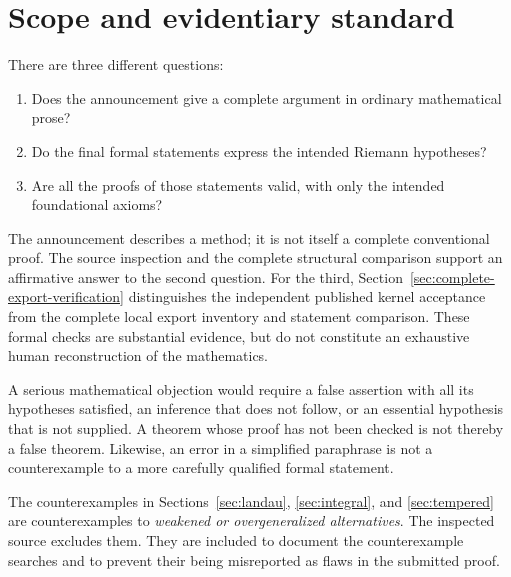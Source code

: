 \documentclass[11pt,a4paper]{article}
\theoremstyle{remark}
\begin{document}
\section{Scope and evidentiary standard}
There are three different questions:
\begin{enumerate}
\item Does the announcement give a complete argument in ordinary mathematical prose?
\item Do the final formal statements express the intended Riemann hypotheses?
\item Are all the proofs of those statements valid, with only the intended foundational axioms?
\end{enumerate}
The announcement describes a method; it is not itself a complete conventional proof. The source inspection and the complete structural comparison support an affirmative answer to the second question. For the third, Section~\ref{sec:complete-export-verification} distinguishes the independent published kernel acceptance from the complete local export inventory and statement comparison. These formal checks are substantial evidence, but do not constitute an exhaustive human reconstruction of the mathematics.

A serious mathematical objection would require a false assertion with all its hypotheses satisfied, an inference that does not follow, or an essential hypothesis that is not supplied. A theorem whose proof has not been checked is not thereby a false theorem. Likewise, an error in a simplified paraphrase is not a counterexample to a more carefully qualified formal statement.

The counterexamples in Sections~\ref{sec:landau}, \ref{sec:integral}, and \ref{sec:tempered} are counterexamples to \emph{weakened or overgeneralized alternatives}. The inspected source excludes them. They are included to document the counterexample searches and to prevent their being misreported as flaws in the submitted proof.
\end{document}
